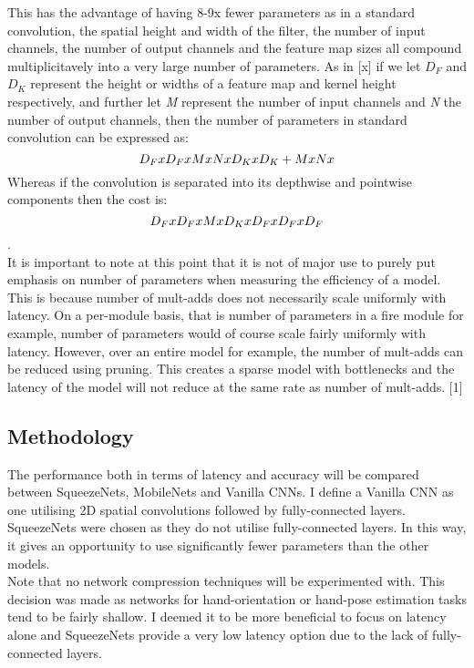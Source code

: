 \documentclass{article}
\begin{document}
This has the advantage of having 8-9x fewer parameters as in a standard convolution, the spatial height and width of the filter, the number of input channels, the number of output channels and the feature map sizes all compound multiplicitavely into a very large number of parameters. As in [x] if we let \emph{$D_{F}$} and \emph{$D_{K}$} represent the height or widths of a feature map and kernel height respectively, and further let \emph{M} represent the number of input channels and \emph{N} the number of output channels, then the number of parameters in standard convolution can be expressed as: \[\emph{$D_{F}$} x \emph{$D_{F}$} x M x N x \emph{$D_{K}$} x \emph{$D_{K}$} + M x N x \] Whereas if the convolution is separated into its depthwise and pointwise components then the cost is: \[\emph{$D_{F}$} x \emph{$D_{F}$} x M x \emph{$D_{K}$} x \emph{$D_{F}$} x \emph{$D_{F}$} x \emph{$D_{F}$}\].\\

It is important to note at this point that it is not of major use to purely put emphasis on number of parameters when measuring the efficiency of a model. This is because number of mult-adds does not necessarily scale uniformly with latency. On a per-module basis, that is number of parameters in a fire module for example, number of parameters would of course scale fairly uniformly with latency. However, over an entire model for example, the number of mult-adds can be reduced using pruning. This creates a sparse model with bottlenecks and the latency of the model will not reduce at the same rate as number of mult-adds. [1] \\


\subsection*{Methodology}
The performance both in terms of latency and accuracy will be compared between SqueezeNets, MobileNets and Vanilla CNNs. I define a Vanilla CNN as one utilising 2D spatial convolutions followed by fully-connected layers. SqueezeNets were chosen as they do not utilise fully-connected layers. In this way, it gives an opportunity to use significantly fewer parameters than the other models.\\

Note that no network compression techniques will be experimented with. This decision was made as networks for hand-orientation or hand-pose estimation tasks tend to be fairly shallow. I deemed it to be more beneficial to focus on latency alone and SqueezeNets provide a very low latency option due to the lack of fully-connected layers.\\
\end{document}
